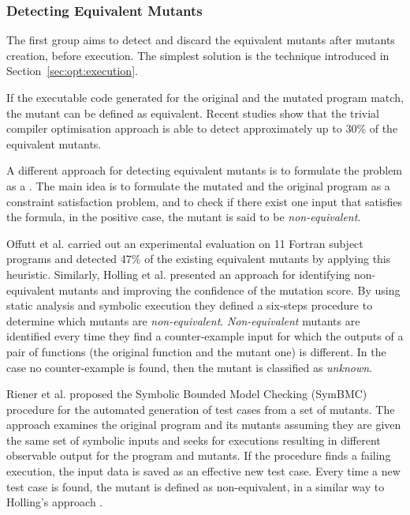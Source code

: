 \subsubsection{Detecting Equivalent Mutants}

The first group aims to detect and discard the equivalent mutants after mutants creation, before execution. The simplest solution is the  \cite{papadakis2015trivial, kintis2017detecting,papadakis2019mutation} technique introduced in Section~\ref{sec:opt:execution}. 

If the executable code generated for the original and the mutated program match, the mutant can be defined as equivalent.
Recent studies \cite{papadakis2015trivial} show that the trivial compiler optimisation approach is able to detect approximately up to 30\% of the equivalent mutants.

A different approach for detecting equivalent mutants is to formulate the problem as a . 
The main idea is to formulate the mutated and the original program as a constraint satisfaction problem, and to check if there exist one input that satisfies the formula, in the positive case, the mutant is said to be \textit{non-equivalent}.

Offutt et al. \cite{offutt1996detecting,offutt1997automatically} carried out an experimental evaluation on 11 Fortran subject programs and detected 47\% of the existing equivalent mutants by applying this heuristic.
Similarly, Holling et al. \cite{holling2016nequivack,papadakis2012mutation} presented an approach for identifying non-equivalent mutants and improving the confidence of the mutation score. By using static analysis and symbolic execution they defined a six-steps procedure to determine which mutants are \textit{non-equivalent}. \textit{Non-equivalent} mutants are identified every time they find a counter-example input for which the outputs of a pair of functions (the original function and the mutant one) is different. In the case no counter-example is found, then the mutant is classified as \textit{unknown}. 

Riener et al. \cite{riener2011test} proposed the Symbolic Bounded Model Checking (SymBMC) procedure for the automated generation of test cases from a set of mutants. The approach examines the original program and its mutants assuming they are given the same set of symbolic  inputs and seeks for executions resulting in different observable output for the program and mutants. If the procedure finds a failing execution, the input data is saved as an effective new test case. Every time a new test case is found, the mutant is defined as non-equivalent, in a similar way to Holling's approach \cite{holling2016nequivack}.

